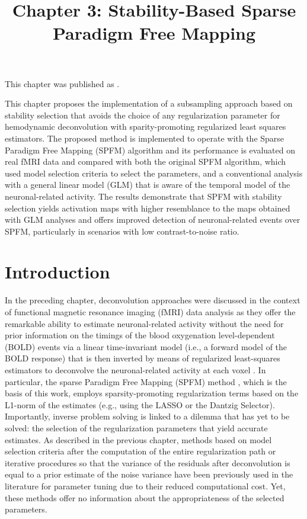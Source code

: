 \title{Chapter 3: Stability-Based Sparse Paradigm Free Mapping}
\label{cha:stability}

This chapter was published as \cite{Urunuela2020StabilityBasedSparse}.

This chapter proposes the implementation of a subsampling approach based on
stability selection that avoids the choice of any regularization parameter for
hemodynamic deconvolution with sparity-promoting regularized least squares
estimators. The proposed method is implemented to operate with the Sparse
Paradigm Free Mapping (SPFM) algorithm and its performance is evaluated on real fMRI
data and compared with both the original SPFM algorithm, which used model
selection criteria to select the parameters, and a conventional analysis with a
general linear model (GLM) that is aware of the temporal model of the
neuronal-related activity. The results demonstrate that SPFM with stability
selection yields activation maps with higher resemblance to the maps obtained
with GLM analyses and offers improved detection of neuronal-related events over
SPFM, particularly in scenarios with low contrast-to-noise ratio.

\section{Introduction}
\label{sec:stability_introduction}

In the preceding chapter, deconvolution approaches were discussed in the context
of functional magnetic resonance imaging (fMRI) data analysis as they offer the
remarkable ability to estimate neuronal-related activity without the need for
prior information on the timings of the blood oxygenation level-dependent (BOLD)
events via a linear time-invariant model (i.e., a forward model of the BOLD
response) that is then inverted by means of regularized least-squares estimators
to deconvolve the neuronal-related activity at each voxel
\citep{Gitelman2003Modelingregionalpsychophysiologic,Khalidov2011ActiveletsWaveletssparse,Karahanoglu2013TotalactivationfMRI,HernandezGarcia2011Neuronaleventdetection,Gaudes2010Detectioncharacterizationsingle,Gaudes2013Paradigmfreemapping}.
In particular, the sparse Paradigm Free Mapping (SPFM) method
\citep{Gaudes2013Paradigmfreemapping}, which is the basis of this work, employs
sparsity-promoting regularization terms based on the L1-norm of the estimates
(e.g., using the LASSO or the Dantzig Selector). Importantly, inverse problem
solving is linked to a dilemma that has yet to be solved: the selection of the
regularization parameters that yield accurate estimates. As described in the
previous chapter,  methods based on model selection criteria after the
computation of the entire regularization path
\citep{Gaudes2013Paradigmfreemapping} or iterative procedures so that the
variance of the residuals after deconvolution is equal to a prior estimate of
the noise variance \citep{Karahanoglu2013TotalactivationfMRI} have been
previously used in the literature for parameter tuning due to their reduced
computational cost. Yet, these methods offer no information about the
appropriateness of the selected parameters.

